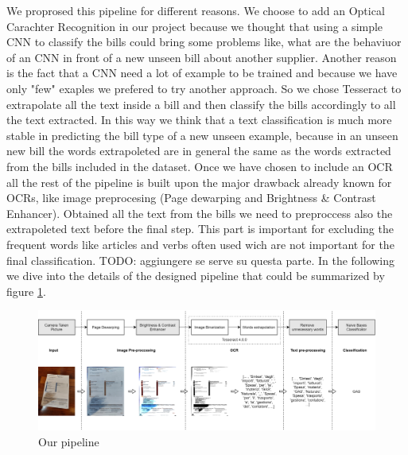 \documentclass[10pt,twocolumn,letterpaper]{article}
\begin{document}
We proprosed this pipeline for different reasons. We choose to add an Optical Carachter Recognition in our project because we thought that using a simple CNN to classify the bills could bring some problems like, what are the behaviuor of an CNN in front of a new unseen bill about another supplier. Another reason is the fact that a CNN need a lot of example to be trained and because we have only "few" exaples we prefered to try another approach. So we chose Tesseract to extrapolate all the text inside a bill and then classify the bills accordingly to all the text extracted. In this way we think that a text classification is much more stable in predicting the bill type of a new unseen example, because in an unseen new bill the words extrapoleted are in general the same as the words extracted from the bills included in the dataset. Once we have chosen to include an OCR all the rest of the pipeline is built upon the major drawback already known for OCRs, like image preprocesing (Page dewarping and Brightness \& Contrast Enhancer). Obtained all the text from the bills we need to preproccess also the extrapoleted text before the final step. This part is important for excluding the frequent words like articles and 
verbs often used wich are not important for the final classification. TODO: aggiungere se serve su questa parte. In the following we dive into the details of the designed pipeline that could be summarized by figure \ref{pipeline}.


\begin{figure}[h]
	\centering
	\includegraphics[width=1.0\textwidth]{images/pipeline.png}
	\caption{Our pipeline}
	\label{pipeline}
\end{figure}
\end{document}
